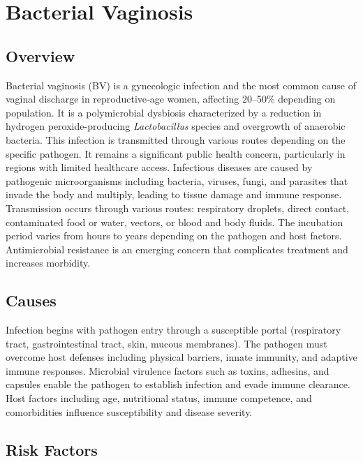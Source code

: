 \chapter{Bacterial Vaginosis}
\label{sec:Bacterial Vaginosis}

\section{Overview}
Bacterial vaginosis (BV) is a gynecologic infection and the most common cause of vaginal discharge in reproductive-age women, affecting 20--50\% depending on population. It is a polymicrobial dysbiosis characterized by a reduction in hydrogen peroxide-producing \textit{Lactobacillus} species and overgrowth of anaerobic bacteria. This infection is transmitted through various routes depending on the specific pathogen. It remains a significant public health concern, particularly in regions with limited healthcare access. Infectious diseases are caused by pathogenic microorganisms including bacteria, viruses, fungi, and parasites that invade the body and multiply, leading to tissue damage and immune response. Transmission occurs through various routes: respiratory droplets, direct contact, contaminated food or water, vectors, or blood and body fluids. The incubation period varies from hours to years depending on the pathogen and host factors. Antimicrobial resistance is an emerging concern that complicates treatment and increases morbidity.
\section{Causes}
Infection begins with pathogen entry through a susceptible portal (respiratory tract, gastrointestinal tract, skin, mucous membranes). The pathogen must overcome host defenses including physical barriers, innate immunity, and adaptive immune responses. Microbial virulence factors such as toxins, adhesins, and capsules enable the pathogen to establish infection and evade immune clearance. Host factors including age, nutritional status, immune competence, and comorbidities influence susceptibility and disease severity.
\section{Risk Factors}


